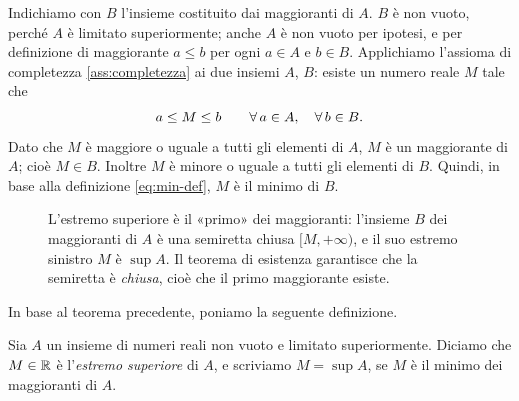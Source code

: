 \begin{dimostrazione}
Indichiamo con $B$ l'insieme costituito dai maggioranti di $A$. $B$ è non vuoto, perché
$A$ è limitato superiormente; anche $A$ è non vuoto per ipotesi, e per definizione di
maggiorante $a\le b$ per ogni $a\in A$ e $b\in B$. Applichiamo l'assioma di completezza
\ref{ass:completezza} ai due insiemi $A$, $B$: esiste un numero reale $M$ tale che
\begin{equation}\label{eq:separatore-sup}
  a\le M\le b \qquad \forall\, a\in A, \quad \forall\, b\in B.
\end{equation}
Dato che $M$ è maggiore o uguale a tutti gli elementi di $A$, $M$ è un maggiorante di
$A$; cioè $M\in B$. Inoltre $M$ è minore o uguale a tutti gli elementi di $B$. Quindi, in
base alla definizione \eqref{eq:min-def}, $M$ è il minimo di $B$.
\end{dimostrazione}

\begin{figure}[htb]
\centering
{}
\caption{L'estremo superiore è il «primo» dei maggioranti: l'insieme $B$ dei maggioranti
di $A$ è una semiretta chiusa $[M,+\infty)$, e il suo estremo sinistro $M$ è $\sup A$.
Il teorema di esistenza garantisce che la semiretta è \emph{chiusa}, cioè che il primo
maggiorante esiste.}
\label{fig:sup-maggioranti}
\end{figure}

In base al teorema precedente, poniamo la seguente definizione.

\begin{definizione}
Sia $A$ un insieme di numeri reali non vuoto e limitato superiormente. Diciamo che
$M\in\mathbb{R}$ è l'\emph{estremo superiore} di $A$, e scriviamo $M=\sup A$, se $M$ è il minimo
dei maggioranti di $A$.
\end{definizione}

